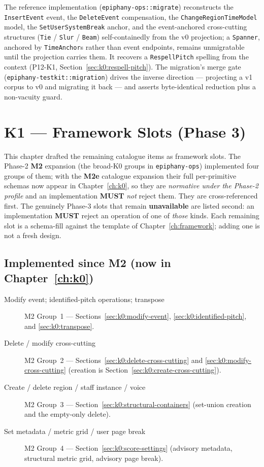 \documentclass[11pt,letterpaper]{report}
\newcommand{\MUST}{\textbf{MUST}}
\begin{document}
The reference implementation (\texttt{epiphany-ops::migrate}) reconstructs the
\texttt{InsertEvent} event, the \texttt{DeleteEvent} compensation, the
\texttt{ChangeRegionTimeModel} model, the \texttt{SetUserSystemBreak} anchor, and
the event-anchored cross-cutting structures (\texttt{Tie} / \texttt{Slur} /
\texttt{Beam}) self-containedly from the v0 projection; a \texttt{Spanner},
anchored by \texttt{TimeAnchor}s rather than event endpoints, remains unmigratable
until the projection carries them. It recovers a \texttt{RespellPitch} spelling
from the context (P12-K1,
Section~\ref{sec:k0:respell-pitch}). The migration's merge gate
(\texttt{epiphany-testkit::migration}) drives the inverse direction --- projecting
a v1 corpus to v0 and migrating it back --- and asserts byte-identical reduction
plus a non-vacuity guard.

\chapter{K1 --- Framework Slots (Phase 3)}
\label{ch:k1}

This chapter drafted the remaining catalogue items as framework slots. The
Phase-2 \textbf{M2} expansion (the broad-K0 groups in \texttt{epiphany-ops})
implemented four groups of them; with the \textbf{M2e} catalogue expansion their
full per-primitive schemas now appear in Chapter~\ref{ch:k0}, so they are
\emph{normative under the Phase-2 profile} and an implementation \MUST{}
\emph{not} reject them. They are cross-referenced first. The genuinely Phase-3
slots that remain \textbf{unavailable} are listed second: an implementation
\MUST{} reject an operation of one of \emph{those} kinds. Each remaining slot is a
schema-fill against the template of Chapter~\ref{ch:framework}; adding one is not
a fresh design.

\section*{Implemented since M2 (now in Chapter~\ref{ch:k0})}

\begin{description}
  \item[Modify event; identified-pitch operations; transpose]
    M2 Group~1 --- Sections~\ref{sec:k0:modify-event},
    \ref{sec:k0:identified-pitch}, and \ref{sec:k0:transpose}.
  \item[Delete / modify cross-cutting]
    M2 Group~2 --- Sections~\ref{sec:k0:delete-cross-cutting} and
    \ref{sec:k0:modify-cross-cutting} (creation is
    Section~\ref{sec:k0:create-cross-cutting}).
  \item[Create / delete region / staff instance / voice]
    M2 Group~3 --- Section~\ref{sec:k0:structural-containers} (set-union creation
    and the empty-only delete).
  \item[Set metadata / metric grid / user page break]
    M2 Group~4 --- Section~\ref{sec:k0:score-settings} (advisory metadata,
    structural metric grid, advisory page break).
\end{description}
\end{document}
